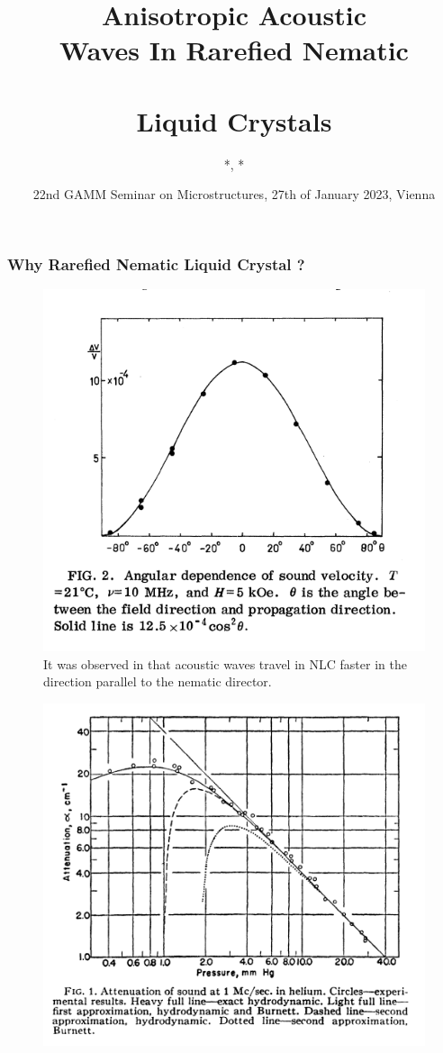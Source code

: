 \documentclass{beamer}
\title[Acoustic Rarefied Nematic Liquid Crystals]{Anisotropic Acoustic \vspace{0.1cm}\\ Waves In Rarefied Nematic\\ \\Liquid Crystals} %
\author%
{%
	\sc{P. E. Farrell} *,\underline{\sc{U. Zerbinati}} *\\
}
\institute%
{%
	* \textit{Mathematical Institute}\\
	\;\textit{University of Oxford}\\
}
\date[Firedrake 2023]{22nd GAMM Seminar on Microstructures, 27th of January 2023, Vienna} %
\begin{document}
	\begin{frame}[plain]
		\titlepage
	\end{frame}
	\begin{frame}
		\frametitle{Why Rarefied Nematic Liquid Crystal ?}
		\begin{minipage}{0.49\textwidth}
			\vspace{0.8cm}
			\begin{figure}
				\includegraphics[scale=0.25]{Figures/MullenLuthiStephen}
				\vspace{-0.4cm}
				\caption{It was observed in \cite{MullenEtAll} that acoustic waves travel in NLC faster in the direction parallel to the nematic director.}
			\end{figure}
		\end{minipage}
		\begin{minipage}{0.49\textwidth}
			\vspace{1cm}
			\begin{figure}
				\includegraphics[scale=0.25]{Figures/Greenspan}

\end{figure}
\end{minipage}
\end{frame}
\end{document}
